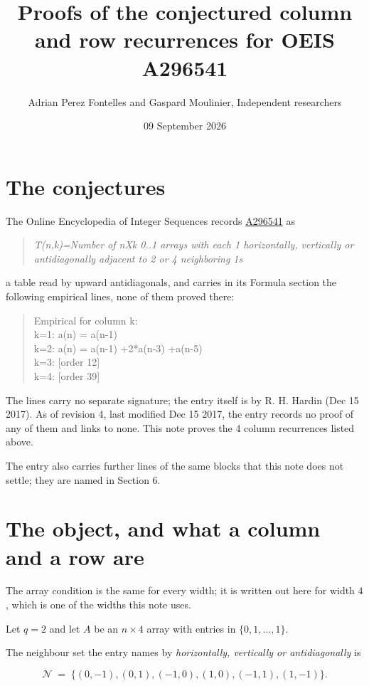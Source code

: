 \documentclass[11pt]{article}
\title{Proofs of the conjectured column and row recurrences for OEIS A296541}
\author{Adrian Perez Fontelles and Gaspard Moulinier, Independent researchers}
\date{09 September 2026}
\theoremstyle{definition}
\begin{document}
\maketitle
\section{The conjectures}

The Online Encyclopedia of Integer Sequences records \href{https://oeis.org/A296541}{A296541} as

\begin{quote}\itshape T(n,k)=Number of nXk 0..1 arrays with each 1 horizontally, vertically or antidiagonally adjacent to 2 or 4 neighboring 1s\end{quote}

a table read by upward antidiagonals, and carries in its Formula section the following empirical lines, none of them proved there:

\begin{quote}\ttfamily Empirical for column k:\\
k=1: a(n) = a(n-1)\\k=2: a(n) = a(n-1) +2*a(n-3) +a(n-5)\\k=3: [order 12]\\k=4: [order 39]\end{quote}

The lines carry no separate signature; the entry itself is by R. H. Hardin (Dec 15 2017). As of revision 4, last modified Dec 15 2017, the entry records no proof of any of them and links to none. This note proves the 4 column recurrences listed above.

The entry also carries further lines of the same blocks that this note does not settle; they are named in Section 6.

\section{The object, and what a column and a row are}

The array condition is the same for every width; it is written out here for width $4$, which is one of the widths this note uses.

Let $q = 2$ and let $A$ be an $n \times 4$ array with entries in $\{0,1,\dots,1\}$.

The neighbour set the entry names by {\itshape horizontally, vertically or antidiagonally} is

\[\mathcal{N} \;=\; \{(0,-1), (0,1), (-1,0), (1,0), (-1,1), (1,-1)\}.\]
\end{document}
